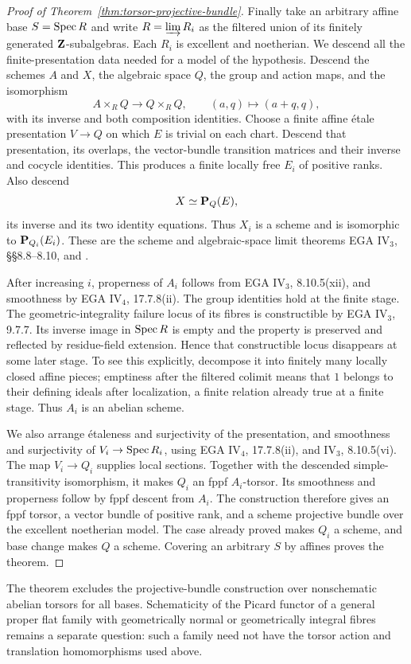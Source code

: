 \begin{proof}[Proof of Theorem~\ref{thm:torsor-projective-bundle}]
Finally take an arbitrary affine base $S=\operatorname{Spec} R$ and write
$R=\varinjlim R_i$ as the filtered union of its finitely
generated $\mathbf Z$-subalgebras. Each $R_i$ is excellent and
noetherian. We descend all the finite-presentation data needed
for a model of the hypothesis.
Descend the schemes $A$ and $X$, the algebraic space $Q$,
the group and action maps, and the isomorphism
\[
 A\times_R Q\longrightarrow Q\times_R Q,\qquad
 (a,q)\longmapsto(a+q,q),
\]
with its inverse and both composition identities.
Choose a finite affine \'etale presentation $V\to Q$
on which $E$ is trivial on each chart. Descend that
presentation, its overlaps, the vector-bundle transition
matrices and their inverse and cocycle identities.
This produces a finite locally free $E_i$ of positive ranks.
Also descend
\[
 X\simeq\mathbf P_Q(E),
\]
its inverse and its two identity equations.
Thus $X_i$ is a scheme and is isomorphic to
$\mathbf P_{Q_i}(E_i)$.
These are the scheme and algebraic-space limit theorems
EGA IV$_3$, \S\S8.8--8.10, and \cite[Tag~07SK]{Stacks}.

After increasing $i$, properness of $A_i$ follows from
EGA IV$_3$, 8.10.5(xii), and smoothness by EGA IV$_4$,
17.7.8(ii). The group identities hold at the finite stage.
The geometric-integrality failure locus of its fibres is
constructible by EGA IV$_3$, 9.7.7.
Its inverse image in $\operatorname{Spec} R$ is empty and the property
is preserved and reflected by residue-field extension.
Hence that constructible locus disappears at some later
stage. To see this explicitly, decompose it into finitely
many locally closed affine pieces; emptiness after the
filtered colimit means that $1$ belongs to their defining
ideals after localization, a finite relation already true
at a finite stage. Thus $A_i$ is an abelian scheme.

We also arrange \'etaleness and surjectivity of the presentation, and
smoothness and surjectivity of $V_i\to\operatorname{Spec} R_i$, using
EGA IV$_4$, 17.7.8(ii), and IV$_3$, 8.10.5(vi).
The map $V_i\to Q_i$ supplies local sections. Together with
the descended simple-transitivity isomorphism, it makes
$Q_i$ an fppf $A_i$-torsor.
Its smoothness and properness follow by fppf descent from
$A_i$. The construction therefore gives an fppf torsor,
a vector bundle of positive rank, and a scheme projective
bundle over the excellent noetherian model.
The case already proved makes $Q_i$ a scheme, and base
change makes $Q$ a scheme. Covering an arbitrary $S$ by
affines proves the theorem.
\end{proof}

The theorem excludes the projective-bundle construction over
nonschematic abelian torsors for all bases. Schematicity of the
Picard functor of a general proper flat family with geometrically
normal or geometrically integral fibres remains a separate
question: such a family need not have the torsor action and
translation homomorphisms used above.
